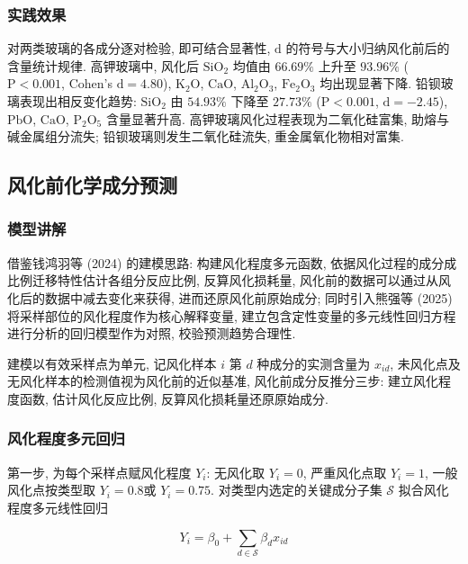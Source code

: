 \documentclass{ctexart}
\begin{document}
\subsubsection{实践效果}

对两类玻璃的各成分逐对检验, 即可结合显著性, $\mathrm{d}$ 的符号与大小归纳风化前后的含量统计规律. 高钾玻璃中, 风化后 $\mathrm{SiO_2}$ 均值由 $66.69\%$ 上升至 $93.96\%$ ($\mathrm{P}<0.001$, Cohen's $\mathrm{d}=4.80$), $\mathrm{K_2O}$, $\mathrm{\mathrm{CaO}}$, $\mathrm{Al_2O_3}$, $\mathrm{Fe_2O_3}$ 均出现显著下降. 铅钡玻璃表现出相反变化趋势: $\mathrm{SiO_2}$ 由 $54.93\%$ 下降至 $27.73\%$ ($\mathrm{P}<0.001$, $\mathrm{d}=-2.45$), $\mathrm{\mathrm{PbO}}$, $\mathrm{\mathrm{CaO}}$, $\mathrm{P_2O_5}$ 含量显著升高. 高钾玻璃风化过程表现为二氧化硅富集, 助熔与碱金属组分流失; 铅钡玻璃则发生二氧化硅流失, 重金属氧化物相对富集.

\subsection{风化前化学成分预测}

\subsubsection{模型讲解}

借鉴钱鸿羽等 (2024) 的建模思路: 构建风化程度多元函数, 依据风化过程的成分成比例迁移特性估计各组分反应比例, 反算风化损耗量, 风化前的数据可以通过从风化后的数据中减去变化来获得, 进而还原风化前原始成分; 同时引入熊强等 (2025) 将采样部位的风化程度作为核心解释变量, 建立包含定性变量的多元线性回归方程进行分析的回归模型作为对照, 校验预测趋势合理性.

建模以有效采样点为单元, 记风化样本 $i$ 第 $d$ 种成分的实测含量为 $x_{id}$, 未风化点及无风化样本的检测值视为风化前的近似基准, 风化前成分反推分三步: 建立风化程度函数, 估计风化反应比例, 反算风化损耗量还原原始成分.


\subsubsection{风化程度多元回归}

第一步, 为每个采样点赋风化程度 $Y_i$: 无风化取 $Y_i=0$, 严重风化点取 $Y_i=1$, 一般风化点按类型取 $Y_i=0.8$或 $Y_i=0.75$. 对类型内选定的关键成分子集 $\mathcal{S}$ 拟合风化程度多元线性回归

\begin{equation*}
Y_i=\beta_{0}+\sum_{d\in\mathcal{S}}\beta_{d}x_{id}
\end{equation*}
\end{document}
